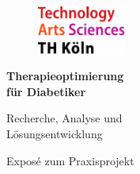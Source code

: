 \documentclass[a4paper, 12pt]{scrartcl}
\begin{document}
\begin{titlepage}
	
	\begin{center}
		
		\begin{figure}[!ht]
			\includegraphics[width=0.26\textwidth]{images/THlogoheader.pdf}
		\end{figure}
		
		\vspace{0.8cm}
		
		\begin{rmfamily}
			\begin{huge}
				\textbf{Therapieoptimierung\\ für Diabetiker}\\	
			\end{huge}
			\vspace{0.5cm}
			\begin{LARGE}
				Recherche, Analyse und\\ Lösungsentwicklung\\
			\end{LARGE}
		\end{rmfamily}
		
		\vspace{1.6cm}
		
		
		
		\begin{LARGE}
			\begin{scshape}
				Exposé zum Praxisprojekt\\[0.8em]
			\end{scshape}
		\end{LARGE}
		

\end{center}
\end{titlepage}
\end{document}
